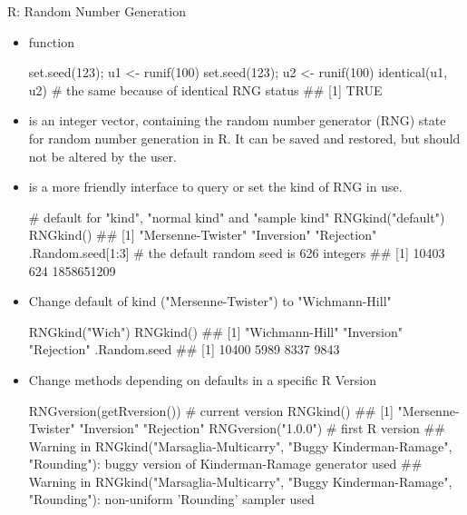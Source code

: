\begin{vbframe}{R: Random Number Generation}
\begin{itemize}
\item {} function

\footnotesize
\begin{verbbox}
set.seed(123); u1 <- runif(100)
set.seed(123); u2 <- runif(100) 
identical(u1, u2) # the same because of identical RNG status
## [1] TRUE
\end{verbbox}
\col

\normalsize
\item {} is an integer vector, containing the random number generator (RNG) state for random number generation in R. It can be saved and restored, but should not be altered by the user.

\item {} is a more friendly interface to query or set the kind of RNG in use.
\footnotesize

\begin{verbbox}
# default for "kind", "normal kind" and "sample kind" 
RNGkind("default") 
RNGkind()
## [1] "Mersenne-Twister" "Inversion"  "Rejection"
.Random.seed[1:3] # the default random seed is 626 integers
## [1] 10403 624 1858651209
\end{verbbox}
\col

\normalsize
\framebreak
\item Change default of kind ("Mersenne-Twister") to "Wichmann-Hill"

\footnotesize
\begin{verbbox}
RNGkind("Wich")
RNGkind()
## [1] "Wichmann-Hill" "Inversion" "Rejection"
.Random.seed
## [1] 10400  5989  8337  9843
\end{verbbox}
\col

\normalsize
\item Change methods depending on defaults in a specific R Version

\footnotesize
\begin{verbbox}
RNGversion(getRversion()) # current version
RNGkind()
## [1] "Mersenne-Twister" "Inversion" "Rejection"
RNGversion("1.0.0") # first R version
## Warning in RNGkind("Marsaglia-Multicarry", "Buggy
Kinderman-Ramage", "Rounding"): buggy version of 
Kinderman-Ramage generator used
## Warning in RNGkind("Marsaglia-Multicarry", "Buggy
Kinderman-Ramage", "Rounding"): non-uniform 'Rounding' 
sampler used
\end{verbbox}
\col

\end{itemize}
\end{vbframe}





